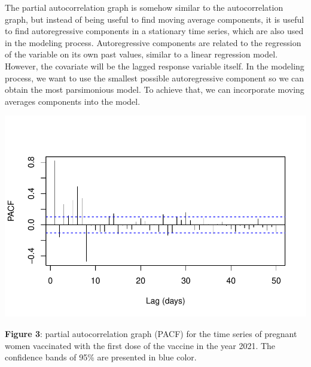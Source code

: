 \documentclass[
]{article}
\newenvironment{Shaded}{\begin{snugshade}}{\end{snugshade}}
\newcommand{\AttributeTok}[1]{\textcolor[rgb]{0.13,0.29,0.53}{#1}}
\newcommand{\DecValTok}[1]{\textcolor[rgb]{0.00,0.00,0.81}{#1}}
\newcommand{\FunctionTok}[1]{\textcolor[rgb]{0.13,0.29,0.53}{\textbf{#1}}}
\newcommand{\NormalTok}[1]{#1}
\newcommand{\SpecialCharTok}[1]{\textcolor[rgb]{0.81,0.36,0.00}{\textbf{#1}}}
\newcommand{\StringTok}[1]{\textcolor[rgb]{0.31,0.60,0.02}{#1}}
\renewenvironment{Shaded}{\begin{mdframed}[ backgroundcolor=shadecolor, linecolor = shadecolor, leftmargin=\dimexpr\leftmargin-2pt\relax, innerleftmargin=1.6pt, innertopmargin=5pt, skipabove=10pt,skipbelow=3pt ]}{\end{mdframed}}
\begin{document}
The partial autocorrelation graph is somehow similar to the
autocorrelation graph, but instead of being useful to find moving
average components, it is useful to find autoregressive components in a
stationary time series, which are also used in the modeling process.
Autoregressive components are related to the regression of the variable
on its own past values, similar to a linear regression model. However,
the covariate will be the lagged response variable itself. In the
modeling process, we want to use the smallest possible autoregressive
component so we can obtain the most parsimonious model. To achieve that,
we can incorporate moving averages components into the model.

\begin{Shaded}
\end{Shaded}

\begin{center}\includegraphics[width=\linewidth]{IF_results_ENG_files/figure-latex/unnamed-chunk-3-1} \end{center}

\textbf{Figure 3}: partial autocorrelation graph (PACF) for the time
series of pregnant women vaccinated with the first dose of the vaccine
in the year 2021. The confidence bands of 95\% are presented in blue
color.
\end{document}
